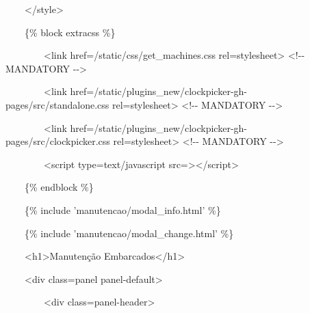 {\ttfamily\color[rgb]{0.10980392,0.10980392,0.10980392}
    \ \ \ \ {\textless}/style{\textgreater}}


    \bigskip

{\ttfamily\color[rgb]{0.10980392,0.10980392,0.10980392}
    \ \ \ \ \{\% block extracss \%\}}

{\ttfamily\color[rgb]{0.10980392,0.10980392,0.10980392}
    \ \ \ \ \ \ \ \ {\textless}link href={\textquotedbl}/static/css/get\_machines.css{\textquotedbl}
    rel={\textquotedbl}stylesheet{\textquotedbl}{\textgreater} {\textless}!-{}- MANDATORY -{}-{\textgreater}}

{\ttfamily\color[rgb]{0.10980392,0.10980392,0.10980392}
    \ \ \ \ \ \ \ \ {\textless}link
        href={\textquotedbl}/static/plugins\_new/clockpicker-gh-pages/src/standalone.css{\textquotedbl}
    rel={\textquotedbl}stylesheet{\textquotedbl}{\textgreater} {\textless}!-{}- MANDATORY -{}-{\textgreater}}

{\ttfamily\color[rgb]{0.10980392,0.10980392,0.10980392}
    \ \ \ \ \ \ \ \ {\textless}link
        href={\textquotedbl}/static/plugins\_new/clockpicker-gh-pages/src/clockpicker.css{\textquotedbl}
    rel={\textquotedbl}stylesheet{\textquotedbl}{\textgreater} {\textless}!-{}- MANDATORY -{}-{\textgreater}}

{\ttfamily\color[rgb]{0.10980392,0.10980392,0.10980392}
    \ \ \ \ \ \ \ \ {\textless}script type={\textquotedbl}text/javascript{\textquotedbl}
    src={\textquotedbl}{\textquotedbl}{\textgreater}{\textless}/script{\textgreater}}

{\ttfamily\color[rgb]{0.10980392,0.10980392,0.10980392}
    \ \ \ \ \{\% endblock \%\}}

{\ttfamily\color[rgb]{0.10980392,0.10980392,0.10980392}
    \ \ \ \ \{\% include 'manutencao/modal\_info.html' \%\}}

{\ttfamily\color[rgb]{0.10980392,0.10980392,0.10980392}
    \ \ \ \ \{\% include 'manutencao/modal\_change.html' \%\}}

{\ttfamily\color[rgb]{0.10980392,0.10980392,0.10980392}
    \ \ \ \ {\textless}h1{\textgreater}Manuten\c{c}\~ao Embarcados{\textless}/h1{\textgreater} \ \ \ }

{\ttfamily\color[rgb]{0.10980392,0.10980392,0.10980392}
    \ \ \ \ {\textless}div class={\textquotedbl}panel panel-default{\textquotedbl}{\textgreater}}

{\ttfamily\color[rgb]{0.10980392,0.10980392,0.10980392}
    \ \ \ \ \ \ \ \ {\textless}div class={\textquotedbl}panel-header{\textquotedbl}{\textgreater}}

